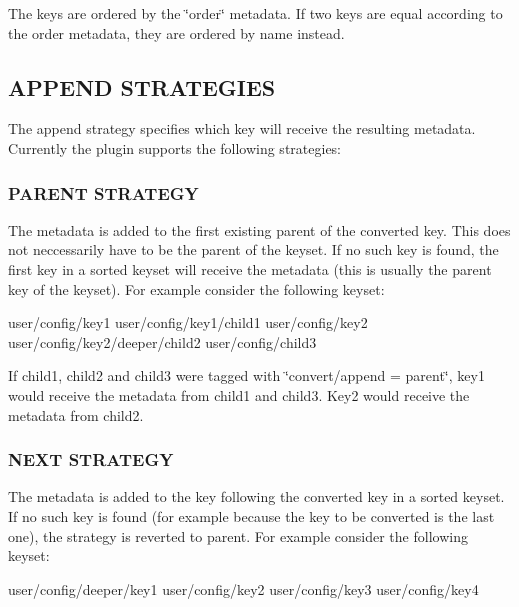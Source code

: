 The keys are ordered by the \char`\"{}order\char`\"{} metadata. If two keys are equal according to the order metadata, they are ordered by name instead.

\subsection*{A\+P\+P\+E\+N\+D S\+T\+R\+A\+T\+E\+G\+I\+E\+S}

The append strategy specifies which key will receive the resulting metadata. Currently the plugin supports the following strategies\+:

\subsubsection*{P\+A\+R\+E\+N\+T S\+T\+R\+A\+T\+E\+G\+Y}

The metadata is added to the first existing parent of the converted key. This does not neccessarily have to be the parent of the keyset. If no such key is found, the first key in a sorted keyset will receive the metadata (this is usually the parent key of the keyset). For example consider the following keyset\+: \begin{DoxyVerb}                            user/config/key1
                            user/config/key1/child1
                            user/config/key2
                            user/config/key2/deeper/child2
                            user/config/child3
\end{DoxyVerb}


If child1, child2 and child3 were tagged with \char`\"{}convert/append = parent\char`\"{}, key1 would receive the metadata from child1 and child3. Key2 would receive the metadata from child2.

\subsubsection*{N\+E\+X\+T S\+T\+R\+A\+T\+E\+G\+Y}

The metadata is added to the key following the converted key in a sorted keyset. If no such key is found (for example because the key to be converted is the last one), the strategy is reverted to parent. For example consider the following keyset\+: \begin{DoxyVerb}                            user/config/deeper/key1
                            user/config/key2
                            user/config/key3
                            user/config/key4
\end{DoxyVerb}


